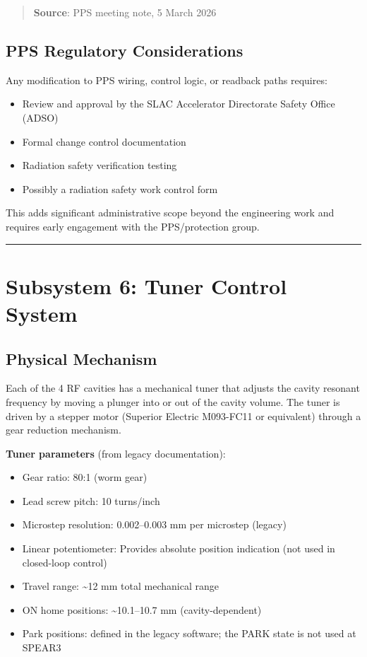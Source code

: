 \begin{quote}
\textbf{Source}: PPS meeting note, 5 March 2026
\end{quote}

\subsection{PPS Regulatory Considerations}\label{pps-regulatory-considerations}

Any modification to PPS wiring, control logic, or readback paths requires:

\begin{itemize}
\tightlist
\item
  Review and approval by the SLAC Accelerator Directorate Safety Office (ADSO)
\item
  Formal change control documentation
\item
  Radiation safety verification testing
\item
  Possibly a radiation safety work control form
\end{itemize}

This adds significant administrative scope beyond the engineering work and requires early engagement with the PPS/protection group.

\begin{center}\rule{0.5\linewidth}{0.5pt}\end{center}

\section{Subsystem 6: Tuner Control System}\label{subsystem-6-tuner-control-system}

\subsection{Physical Mechanism}\label{physical-mechanism}

Each of the 4 RF cavities has a mechanical tuner that adjusts the cavity resonant frequency by moving a plunger into or out of the cavity volume. The tuner is driven by a stepper motor (Superior Electric M093-FC11 or equivalent) through a gear reduction mechanism.

\textbf{Tuner parameters} (from legacy documentation):

\begin{itemize}
\tightlist
\item
  Gear ratio: 80:1 (worm gear)
\item
  Lead screw pitch: 10 turns/inch
\item
  Microstep resolution: 0.002--0.003 mm per microstep (legacy)
\item
  Linear potentiometer: Provides absolute position indication (not used in closed-loop control)
\item
  Travel range: \textasciitilde12 mm total mechanical range
\item
  ON home positions: \textasciitilde10.1--10.7 mm (cavity-dependent)
\item
  Park positions: defined in the legacy software; the PARK state is not used at SPEAR3
\end{itemize}

